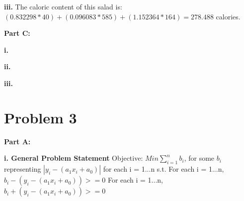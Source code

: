 \documentclass[paper=a4, fontsize=11pt]{scrartcl} %
\numberwithin{equation}{section} %
\numberwithin{figure}{section} %
\numberwithin{table}{section} %
\begin{document}
    \textbf{iii.}\newline
    The caloric content of this salad is: $(0.832298 * 40) + (0.096083 * 585)  + (1.152364 * 164) = 278.488$ calories.
    
\textbf{Part C:}
	
    \textbf{i.}
    
    \textbf{ii.}
    
    \textbf{iii.}
    
\section{Problem 3}
\textbf{Part A:}

    \textbf{i. General Problem Statement}\newline
	Objective:\newline    
    $Min \sum_{i=1}^{n}{b_i}$, for some $b_i$ representing $|y_i - (a_1x_i + a_0)|$ for each i = 1...n\newline
    s.t.\newline
    For each i = 1...n, $b_i - (y_i - (a_1x_i + a_0)) >= 0$\newline
    For each i = 1...n, $b_i + (y_i - (a_1x_i + a_0)) >= 0$\newline
    
\end{document}
